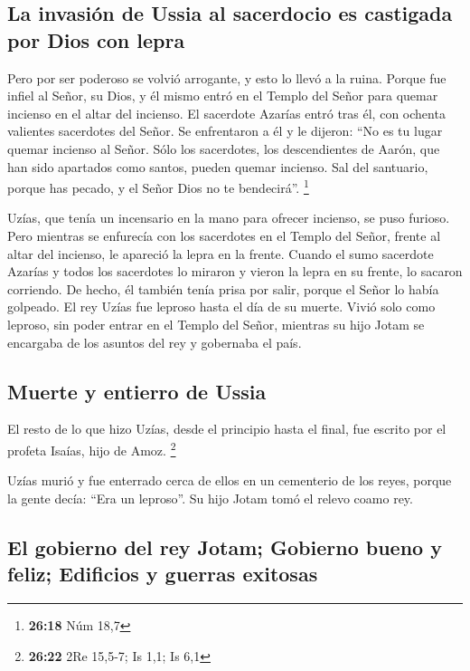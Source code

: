 \hypertarget{la-invasiuxf3n-de-ussia-al-sacerdocio-es-castigada-por-dios-con-lepra}{%
\subsection{La invasión de Ussia al sacerdocio es castigada por Dios con
lepra}\label{la-invasiuxf3n-de-ussia-al-sacerdocio-es-castigada-por-dios-con-lepra}}

 Pero por ser poderoso se volvió arrogante, y esto lo
llevó a la ruina. Porque fue infiel al Señor, su Dios, y él mismo entró
en el Templo del Señor para quemar incienso en el altar del incienso.
 El sacerdote Azarías entró tras él, con ochenta
valientes sacerdotes del Señor.  Se enfrentaron a él y le
dijeron: ``No es tu lugar quemar incienso al Señor. Sólo los sacerdotes,
los descendientes de Aarón, que han sido apartados como santos, pueden
quemar incienso. Sal del santuario, porque has pecado, y el Señor Dios
no te bendecirá''. \footnote{\textbf{26:18} Núm 18,7}

 Uzías, que tenía un incensario en la mano para ofrecer
incienso, se puso furioso. Pero mientras se enfurecía con los sacerdotes
en el Templo del Señor, frente al altar del incienso, le apareció la
lepra en la frente.  Cuando el sumo sacerdote Azarías y
todos los sacerdotes lo miraron y vieron la lepra en su frente, lo
sacaron corriendo. De hecho, él también tenía prisa por salir, porque el
Señor lo había golpeado.  El rey Uzías fue leproso hasta
el día de su muerte. Vivió solo como leproso, sin poder entrar en el
Templo del Señor, mientras su hijo Jotam se encargaba de los asuntos del
rey y gobernaba el país.

\hypertarget{muerte-y-entierro-de-ussia}{%
\subsection{Muerte y entierro de
Ussia}\label{muerte-y-entierro-de-ussia}}

 El resto de lo que hizo Uzías, desde el principio hasta
el final, fue escrito por el profeta Isaías, hijo de Amoz. \footnote{\textbf{26:22}
  2Re 15,5-7; Is 1,1; Is 6,1}

 Uzías murió y fue enterrado cerca de ellos en un
cementerio de los reyes, porque la gente decía: ``Era un leproso''. Su
hijo Jotam tomó el relevo coamo rey.

\hypertarget{el-gobierno-del-rey-jotam-gobierno-bueno-y-feliz-edificios-y-guerras-exitosas}{%
\subsection{El gobierno del rey Jotam; Gobierno bueno y feliz; Edificios
y guerras
exitosas}\label{el-gobierno-del-rey-jotam-gobierno-bueno-y-feliz-edificios-y-guerras-exitosas}}

